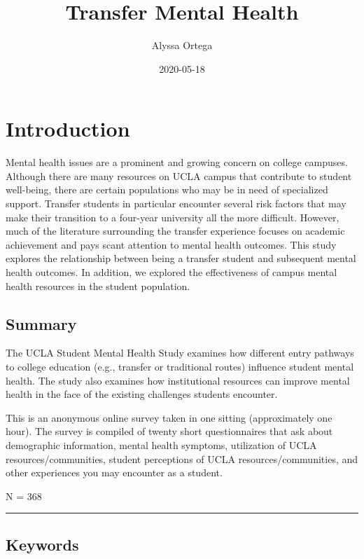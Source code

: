 \documentclass[]{book}
\title{Transfer Mental Health}
\author{Alyssa Ortega}
\date{2020-05-18}
\begin{document}
\maketitle

{
\setcounter{tocdepth}{1}
\tableofcontents
}
\hypertarget{introduction}{%
\chapter{Introduction}\label{introduction}}

Mental health issues are a prominent and growing concern on college campuses. Although there are many resources on UCLA campus that contribute to student well-being, there are certain populations who may be in need of specialized support. Transfer students in particular encounter several risk factors that may make their transition to a four-year university all the more difficult. However, much of the literature surrounding the transfer experience focuses on academic achievement and pays scant attention to mental health outcomes. This study explores the relationship between being a transfer student and subsequent mental health outcomes. In addition, we explored the effectiveness of campus mental health resources in the student population.

\hypertarget{summary}{%
\section{Summary}\label{summary}}

The UCLA Student Mental Health Study examines how different entry pathways to college education (e.g., transfer or traditional routes) influence student mental health. The study also examines how institutional resources can improve mental health in the face of the existing challenges students encounter.

This is an anonymous online survey taken in one sitting (approximately one hour). The survey is compiled of twenty short questionnaires that ask about demographic information, mental health symptoms, utilization of UCLA resources/communities, student perceptions of UCLA resources/communities, and other experiences you may encounter as a student.

N = 368

\begin{center}\rule{0.5\linewidth}{0.5pt}\end{center}

\hypertarget{keywords}{%
\section{Keywords}\label{keywords}}
\end{document}
